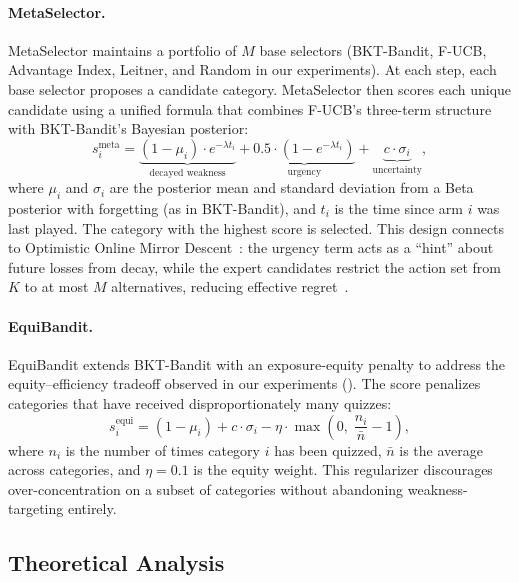\paragraph{MetaSelector.}
MetaSelector maintains a portfolio of $M$ base selectors (BKT-Bandit, F-UCB, Advantage Index, Leitner, and Random in our experiments).
At each step, each base selector proposes a candidate category.
MetaSelector then scores each unique candidate using a unified formula that combines F-UCB's three-term structure with BKT-Bandit's Bayesian posterior:
\begin{equation}
    s_i^{\text{meta}} = \underbrace{(1 - \mu_i) \cdot e^{-\lambda t_i}}_{\text{decayed weakness}} + \underbrace{0.5 \cdot (1 - e^{-\lambda t_i})}_{\text{urgency}} + \underbrace{c \cdot \sigma_i}_{\text{uncertainty}},
    \label{eq:meta}
\end{equation}
where $\mu_i$ and $\sigma_i$ are the posterior mean and standard deviation from a Beta posterior with forgetting (as in BKT-Bandit), and $t_i$ is the time since arm $i$ was last played.
The category with the highest score is selected.
This design connects to Optimistic Online Mirror Descent~\citep{orabona2025online}: the urgency term acts as a ``hint'' about future losses from decay, while the expert candidates restrict the action set from $K$ to at most $M$ alternatives, reducing effective regret~\citep{orabona2025online}.

\paragraph{EquiBandit.}
EquiBandit extends BKT-Bandit with an exposure-equity penalty to address the equity--efficiency tradeoff observed in our experiments ().
The score penalizes categories that have received disproportionately many quizzes:
\begin{equation}
    s_i^{\text{equi}} = (1 - \mu_i) + c \cdot \sigma_i - \eta \cdot \max\!\left(0,\; \frac{n_i}{\bar{n}} - 1\right),
\end{equation}
where $n_i$ is the number of times category $i$ has been quizzed, $\bar{n}$ is the average across categories, and $\eta = 0.1$ is the equity weight.
This regularizer discourages over-concentration on a subset of categories without abandoning weakness-targeting entirely.

\subsection{Theoretical Analysis}
\label{sec:theory}

